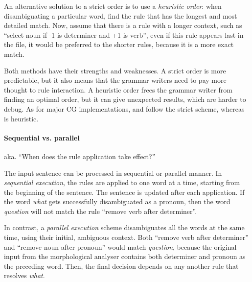 					
An alternative solution to a strict order is to use a \emph{heuristic order}: when disambiguating a particular word, find the rule that has the longest and most detailed match. Now, assume that there is a rule with a longer context, such as ``select noun if -1 is determiner and +1 is verb'', even if this rule appears last in the file, it would be preferred to the shorter rules, because it is a more exact match.
					
Both methods have their strengths and weaknesses. A strict order is more predictable, but it also means that the grammar writers need to pay more thought to rule interaction. A heuristic order frees the grammar writer from finding an optimal order, but it can give unexpected results, which are harder to debug.
As for major CG implementations, \cite{karlsson1990cgp} and \cite{vislcg3} follow the strict scheme, whereas \cite{tapanainen1996} is heuristic.


\paragraph{Sequential vs. parallel}

aka. ``When does the rule application take effect?''

The input sentence can be processed in sequential or parallel manner.
In \emph{sequential execution}, the rules are applied to one word at a time, starting from the beginning of the sentence. The sentence is updated after each application. If the word \emph{what} gets successfully disambiguated as a pronoun, then the word \emph{question} will not match the rule ``remove verb after determiner''.


In contrast, a \emph{parallel execution} scheme disambiguates all the words at the same 
time, using their initial, ambiguous context. Both ``remove verb after determiner'' and 
``remove noun after pronoun'' would match \emph{question}, because the original 
input from the morphological analyser contains both determiner and pronoun as the 
preceding word. Then, the final decision depends on any another rule that resolves \emph{what}.

